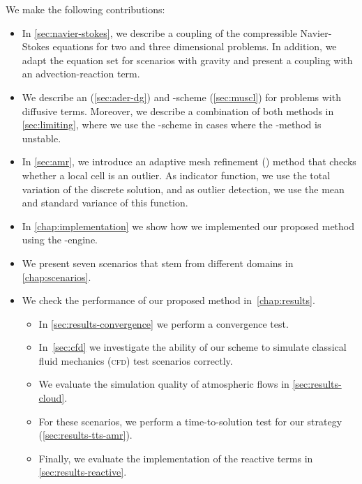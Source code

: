 We make the following contributions:
\begin{itemize}
\item In \cref{sec:navier-stokes}, we describe a coupling of the compressible Navier-Stokes equations for two and three dimensional problems.
In addition, we adapt the equation set for scenarios with gravity and present a coupling with an advection-reaction term.
\item We describe an \aderdg{} (\cref{sec:ader-dg}) and \muscl{}-scheme (\cref{sec:muscl}) for problems with diffusive terms.
  Moreover, we describe a combination of both methods in \cref{sec:limiting}, where we use the \muscl{}-scheme in cases where the \aderdg{}-method is unstable.
\item In \cref{sec:amr}, we introduce an adaptive mesh refinement (\amr{}) method that checks whether a local cell is an outlier.
  As indicator function, we use the total variation of the discrete solution, and as outlier detection, we use the mean and standard variance of this function.
\item In \cref{chap:implementation} we show how we implemented our proposed method using the \exahype{}-engine.
\item We present seven scenarios that stem from different domains in \cref{chap:scenarios}.
\item We check the performance of our proposed method in~\cref{chap:results}.
  \begin{itemize}
  \item In \cref{sec:results-convergence} we perform a convergence test.
  \item In~\cref{sec:cfd} we investigate the ability of our scheme to simulate classical fluid mechanics (\textsc{cfd}) test scenarios correctly.
  \item We evaluate the simulation quality of atmospheric flows in \cref{sec:results-cloud}.
  \item For these scenarios, we perform a time-to-solution test for our \amr{} strategy (\cref{sec:results-tts-amr}).
  \item Finally, we evaluate the implementation of the reactive terms in \cref{sec:results-reactive}.
\end{itemize}
\end{itemize}

